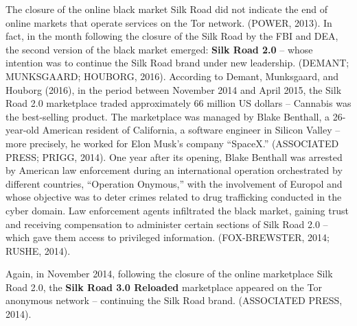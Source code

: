 The closure of the online black market Silk Road did not indicate the end of online markets that operate services on the Tor network. (POWER, 2013). In fact, in the month following the closure of the Silk Road by the FBI and DEA, the second version of the black market emerged: \textbf{Silk Road 2.0} -- whose intention was to continue the Silk Road brand under new leadership. (DEMANT; MUNKSGAARD; HOUBORG, 2016). According to Demant, Munksgaard, and Houborg (2016), in the period between November 2014 and April 2015, the Silk Road 2.0 marketplace traded approximately 66 million US dollars -- Cannabis was the best-selling product. The marketplace was managed by Blake Benthall, a 26-year-old American resident of California, a software engineer in Silicon Valley -- more precisely, he worked for Elon Musk's company ``SpaceX.'' (ASSOCIATED PRESS; PRIGG, 2014). One year after its opening, Blake Benthall was arrested by American law enforcement during an international operation orchestrated by different countries, ``Operation Onymous,'' with the involvement of Europol and whose objective was to deter crimes related to drug trafficking conducted in the cyber domain. Law enforcement agents infiltrated the black market, gaining trust and receiving compensation to administer certain sections of Silk Road 2.0 -- which gave them access to privileged information. (FOX-BREWSTER, 2014; RUSHE, 2014).

Again, in November 2014, following the closure of the online marketplace Silk Road 2.0, the \textbf{Silk Road 3.0 Reloaded} marketplace appeared on the Tor anonymous network -- continuing the Silk Road brand. (ASSOCIATED PRESS, 2014).

